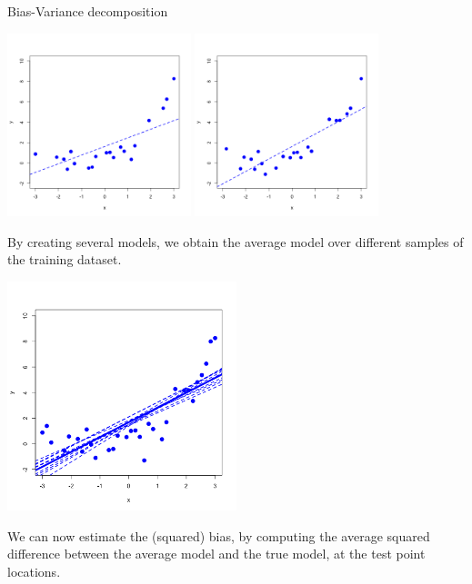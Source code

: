 \documentclass[11pt,compress,t,notes=noshow, xcolor=table]{beamer}
\begin{document}
\begin{vbframe} {Bias-Variance decomposition}
\begin{center}
  \includegraphics[width = 0.4\textwidth]{figure/bias_variance_decomposition-bootstrap_1.png}
  \includegraphics[width = 0.4\textwidth]{figure/bias_variance_decomposition-bootstrap_2.png}
\end{center}

\framebreak

By creating several models, we obtain the average model over different samples of the training dataset.

\begin{center}
  \includegraphics[width = 0.5\textwidth]{figure/bias_variance_decomposition-linear_model.png}
\end{center}

\framebreak

We can now estimate the (squared) bias, by computing the average squared difference between the average model and the true model, at the test point locations.


\end{vbframe}
\end{document}
